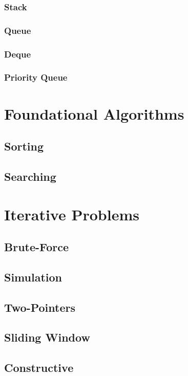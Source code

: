 \documentclass[12pt]{article}
\begin{document}
\subsubsection{Stack}
\subsubsection{Queue}
\subsubsection{Deque}
\subsubsection{Priority Queue}

\hspace{0mm}

\section{Foundational Algorithms}
\subsection{Sorting}
\subsection{Searching}

\hspace{0mm}

\section{Iterative Problems}
\subsection{Brute-Force}
\subsection{Simulation}
\subsection{Two-Pointers}
\subsection{Sliding Window}
\subsection{Constructive}
\end{document}
